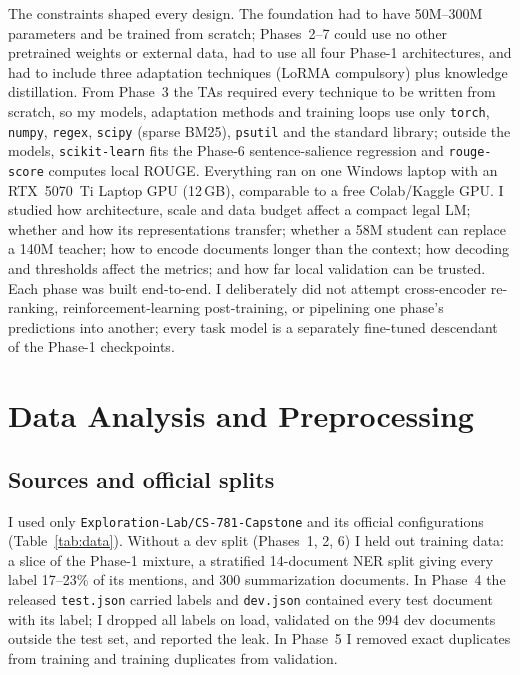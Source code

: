 \documentclass[11pt, oneside]{article}
\begin{document}
The constraints shaped every design. The foundation had to have 50M--300M parameters and be trained from scratch;
Phases~2--7 could use no other pretrained weights or external data, had to use all four Phase-1 architectures, and
had to include three adaptation techniques (LoRMA compulsory) plus knowledge distillation. From Phase~3 the TAs
required every technique to be written from scratch, so my models, adaptation methods and training loops use only
\texttt{torch}, \texttt{numpy}, \texttt{regex}, \texttt{scipy} (sparse BM25), \texttt{psutil} and the standard
library; outside the models, \texttt{scikit-learn} fits the Phase-6 sentence-salience regression and
\texttt{rouge-score} computes local ROUGE. Everything ran on one Windows
laptop with an RTX~5070~Ti Laptop GPU (12\,GB), comparable to a free Colab/Kaggle GPU. I studied how architecture,
scale and data budget affect a compact legal LM; whether and how its representations transfer; whether a 58M student
can replace a 140M teacher; how to encode documents longer than the context; how decoding and thresholds affect the
metrics; and how far local validation can be trusted. Each phase was built end-to-end. I deliberately did not
attempt cross-encoder re-ranking, reinforcement-learning post-training, or pipelining one phase's predictions into
another; every task model is a separately fine-tuned descendant of the Phase-1 checkpoints.

\section{Data Analysis and Preprocessing}
\subsection{Sources and official splits}
I used only \texttt{Exploration-Lab/CS-781-Capstone} and its official configurations (Table~\ref{tab:data}).
Without a dev split (Phases~1, 2, 6) I held out training data: a slice of the Phase-1 mixture, a stratified
14-document NER split giving every label 17--23\% of its mentions, and 300 summarization documents. In Phase~4 the
released \texttt{test.json} carried labels and \texttt{dev.json} contained every test document with its label; I
dropped all labels on load, validated on the 994 dev documents outside the test set, and reported the leak. In
Phase~5 I removed exact duplicates from training and training duplicates from validation.
\end{document}

